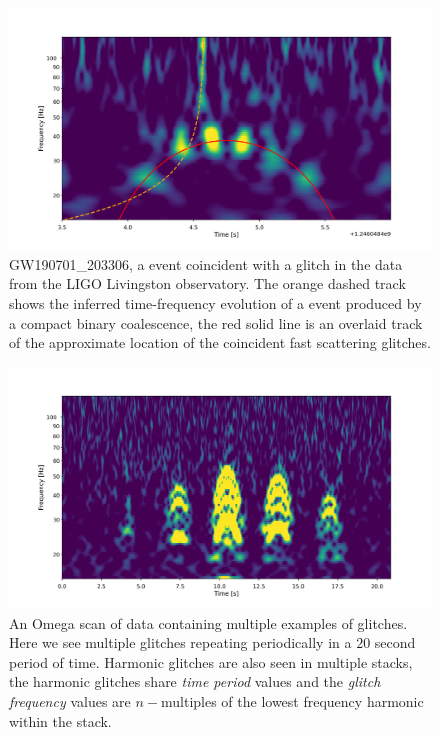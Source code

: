\begin{figure}
  \includegraphics[width=\textwidth]{images/4_archenemy/Section1/GW190701_203306_overlay.pdf}
  \caption{GW190701\_203306, a \gwadj event coincident with a \scladj glitch in the data from the LIGO Livingston observatory. The orange dashed track shows the inferred time-frequency evolution of a \gwadj event produced by a compact binary coalescence, the red solid line is an overlaid track of the approximate location of the coincident fast scattering glitches.}
  \label{4:fig:obscured_detection}
\end{figure}

\begin{figure}
  \includegraphics[width=\textwidth]{images/4_archenemy/Section1/multiple_harmonics.pdf}
  \caption{An Omega scan \cite{gwdetchar_tools:2021} of \gwadj data containing multiple examples of \scladj glitches. Here we see multiple \scladj glitches repeating periodically in a $20$ second period of time. Harmonic \scladj glitches are also seen in multiple stacks, the harmonic glitches share \emph{time period} values and the \emph{glitch frequency} values are $n-$multiples of the lowest frequency harmonic within the stack.}
  \label{4:fig:consec_scattered_light}
\end{figure}

